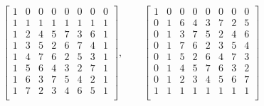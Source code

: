 $$
\left[
\begin{array}{*{8}{c}}
1 & 0 & 0 & 0 & 0 & 0 & 0 & 0\\
1 & 1 & 1 & 1 & 1 & 1 & 1 & 1\\
1 & 2 & 4 & 5 & 7 & 3 & 6 & 1\\
1 & 3 & 5 & 2 & 6 & 7 & 4 & 1\\
1 & 4 & 7 & 6 & 2 & 5 & 3 & 1\\
1 & 5 & 6 & 4 & 3 & 2 & 7 & 1\\
1 & 6 & 3 & 7 & 5 & 4 & 2 & 1\\
1 & 7 & 2 & 3 & 4 & 6 & 5 & 1\\
\end{array}
\right]
, \qquad
\left[
\begin{array}{*{8}{c}}
1 & 0 & 0 & 0 & 0 & 0 & 0 & 0\\
0 & 1 & 6 & 4 & 3 & 7 & 2 & 5\\
0 & 1 & 3 & 7 & 5 & 2 & 4 & 6\\
0 & 1 & 7 & 6 & 2 & 3 & 5 & 4\\
0 & 1 & 5 & 2 & 6 & 4 & 7 & 3\\
0 & 1 & 4 & 5 & 7 & 6 & 3 & 2\\
0 & 1 & 2 & 3 & 4 & 5 & 6 & 7\\
1 & 1 & 1 & 1 & 1 & 1 & 1 & 1\\
\end{array}
\right]
$$
